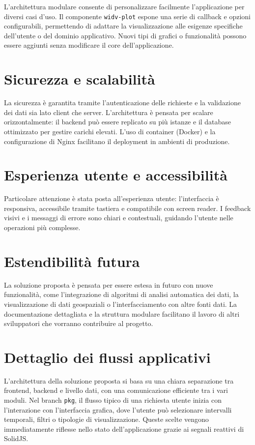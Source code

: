 L'architettura modulare consente di personalizzare facilmente l'applicazione per diversi casi d'uso. Il componente \texttt{widv-plot} espone una serie di callback e opzioni configurabili, permettendo di adattare la visualizzazione alle esigenze specifiche dell'utente o del dominio applicativo. Nuovi tipi di grafici o funzionalità possono essere aggiunti senza modificare il core dell'applicazione.

\section{Sicurezza e scalabilità}

La sicurezza è garantita tramite l'autenticazione delle richieste e la validazione dei dati sia lato client che server. L'architettura è pensata per scalare orizzontalmente: il backend può essere replicato su più istanze e il database ottimizzato per gestire carichi elevati. L'uso di container (Docker) e la configurazione di Nginx facilitano il deployment in ambienti di produzione.

\section{Esperienza utente e accessibilità}

Particolare attenzione è stata posta all'esperienza utente: l'interfaccia è responsiva, accessibile tramite tastiera e compatibile con screen reader. I feedback visivi e i messaggi di errore sono chiari e contestuali, guidando l'utente nelle operazioni più complesse.

\section{Estendibilità futura}

La soluzione proposta è pensata per essere estesa in futuro con nuove funzionalità, come l'integrazione di algoritmi di analisi automatica dei dati, la visualizzazione di dati geospaziali o l'interfacciamento con altre fonti dati. La documentazione dettagliata e la struttura modulare facilitano il lavoro di altri sviluppatori che vorranno contribuire al progetto.
\section{Dettaglio dei flussi applicativi}

L’architettura della soluzione proposta si basa su una chiara separazione tra frontend, backend e livello dati, con una comunicazione efficiente tra i vari moduli. Nel branch \texttt{pkg}, il flusso tipico di una richiesta utente inizia con l’interazione con l’interfaccia grafica, dove l’utente può selezionare intervalli temporali, filtri o tipologie di visualizzazione. Queste scelte vengono immediatamente riflesse nello stato dell’applicazione grazie ai segnali reattivi di SolidJS.

